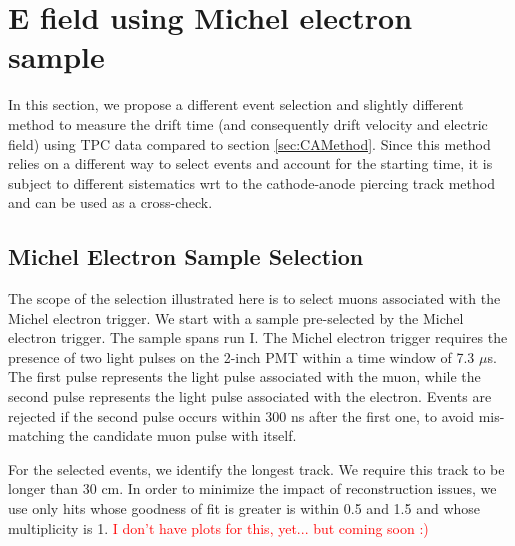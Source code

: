 \section{E field using Michel electron sample}\label{sec:michelEl}
In this section, we propose a different event selection and slightly different method to measure the drift time (and consequently drift velocity and electric field) using TPC data compared to section \ref{sec:CAMethod}.
Since this method relies on a different way to select events and account for the starting time, it is subject to different sistematics wrt to the cathode-anode piercing track method and can be used as a cross-check.

\subsection{Michel Electron Sample Selection}\label{sec:SampleSelectionME}
The scope of the selection illustrated here is to select muons associated with the Michel electron trigger. 
We start with a sample pre-selected by the Michel electron trigger. The sample spans run I. The Michel electron trigger requires the presence of two light pulses on the 2-inch PMT within a time window of 7.3 $\mu$s. The first pulse represents the light pulse associated with the muon, while the second pulse  represents the light pulse associated with the electron. Events are rejected if the second pulse occurs within 300 ns  after the first one, to avoid mis-matching the candidate muon pulse with itself.

For the selected events, we identify the longest track. We require this track to be longer than 30 cm. In order to minimize the impact of reconstruction issues, we use only hits whose goodness of fit is greater is within 0.5 and 1.5 and whose multiplicity is 1.
\textcolor{red}{I don't have plots for this, yet... but coming soon :) }


